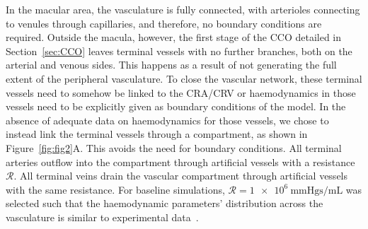 \documentclass[11pt,]{article}
\begin{document}
In the macular area, the vasculature is fully connected, with
arterioles connecting to venules through capillaries, and therefore, no boundary conditions are required.
Outside the macula, however, the first stage of the CCO detailed in
Section~\ref{sec:CCO} leaves terminal vessels with no further branches, both on the arterial and venous sides.
This happens as a result of not generating the full extent of the peripheral vasculature.
To close the vascular network, these terminal vessels need to somehow be linked to the CRA/CRV or haemodynamics in those vessels need to be explicitly given as boundary conditions of the model.
In the absence of adequate data on haemodynamics for those vessels, we chose to instead link the terminal vessels through a compartment, as shown in Figure~\ref{fig:fig2}A.
This avoids the need for boundary conditions.
All terminal arteries outflow into the compartment through artificial vessels with a resistance $\mathcal R$.
All terminal veins drain the vascular compartment through artificial vessels with the same resistance. 
For baseline simulations, $\mathcal R=\SI[per-mode=symbol]{1e6}{\mmHg\second\per\mL}$ was selected such that the haemodynamic parameters' distribution across the vasculature is similar to experimental data~\cite{DoblhoffDier2014,Riva1985}.
\end{document}
